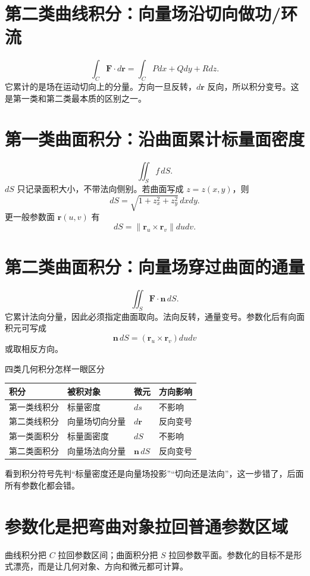 \documentclass[11pt,a4paper,openany]{ctexbook}
\begin{document}
\section{第二类曲线积分：向量场沿切向做功/环流}
\[
\int_C \bm F\cdot d\bm r=\int_C Pdx+Qdy+Rdz.
\]
它累计的是场在运动切向上的分量。方向一旦反转，$d\bm r$ 反向，所以积分变号。这是第一类和第二类最本质的区别之一。

\section{第一类曲面积分：沿曲面累计标量面密度}
\[
\iint_S f\,dS.
\]
$dS$ 只记录面积大小，不带法向侧别。若曲面写成 $z=z(x,y)$，则
\[
dS=\sqrt{1+z_x^2+z_y^2}\,dxdy.
\]
更一般参数面 $\bm r(u,v)$ 有
\[
dS=\|\bm r_u\times\bm r_v\|dudv.
\]

\section{第二类曲面积分：向量场穿过曲面的通量}
\[
\iint_S \bm F\cdot\bm n\,dS.
\]
它累计法向分量，因此必须指定曲面取向。法向反转，通量变号。参数化后有向面积元可写成
\[
\bm n\,dS=(\bm r_u\times\bm r_v)dudv
\]
或取相反方向。

\begin{boundarybox}{四类几何积分怎样一眼区分}
\vspace{0.2em}
\begin{center}
\small
\begin{tabularx}{\linewidth}{L{2.6cm}L{3.6cm}L{2.2cm}Y}
\toprule
\textbf{积分} & \textbf{被积对象} & \textbf{微元} & \textbf{方向影响}\\
\midrule
第一类线积分 & 标量密度 & $ds$ & 不影响\\
第二类线积分 & 向量场切向分量 & $d\bm r$ & 反向变号\\
第一类面积分 & 标量面密度 & $dS$ & 不影响\\
第二类面积分 & 向量场法向分量 & $\bm n\,dS$ & 反向变号\\
\bottomrule
\end{tabularx}
\end{center}
\vspace{0.2em}
看到积分符号先判“标量密度还是向量场投影”“切向还是法向”，这一步错了，后面所有参数化都会错。
\end{boundarybox}

\section{参数化是把弯曲对象拉回普通参数区域}
曲线积分把 $C$ 拉回参数区间；曲面积分把 $S$ 拉回参数平面。参数化的目标不是形式漂亮，而是让几何对象、方向和微元都可计算。
\end{document}
